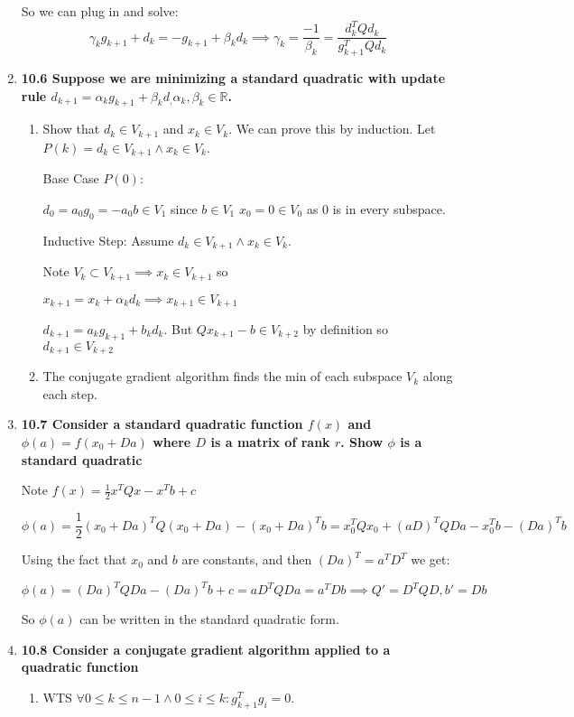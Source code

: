 \documentclass[10pt,a4paper]{article}
\begin{document}
\begin{enumerate}
    So we can plug in and solve: $$\gamma_k g_{k+1}+d_k =  -g_{k+1} + \beta_k d_k \implies \gamma_k = \frac{-1}{\beta_k} = \frac{d_k^TQd_k}{g_{k+1}^TQd_k}$$


    \item \textbf{10.6 Suppose we are minimizing a standard quadratic with update rule $d_{k+1} = \alpha_k g_{k+1} +\beta_k d_, \alpha_k, \beta_k \in \mathbb{R}$. }
    \begin{enumerate}
        \item Show that $d_k \in V_{k+1}$ and $x_k \in V_k$. 
        We can prove this by induction. Let $P(k) = d_k \in V_{k+1} \land x_k \in V_k$.

        Base Case $P(0)$:

        $d_0 = a_0g_0 = -a_0b \in V_1$ since $b \in V_1$ 
        $x_0 = 0 \in V_0$ as $0$ is in every subspace.

        Inductive Step: Assume $d_k \in V_{k+1} \land x_k \in V_{k}$.

        Note $V_k \subset V_{k+1} \implies x_k \in V_{k+1}$ so 

        $x_{k+1} = x_k + \alpha_k d_k \implies x_{k+1} \in V_{k+1}$

        $d_{k+1} = a_k g_{k+1} + b_k d_k$. But $Qx_{k+1} -b \in V_{k+2}$ by definition so $d_{k+1} \in V_{k+2}$

        \item The conjugate gradient algorithm finds the min of each subspace $V_k$ along each step.

    \end{enumerate}

    \item \textbf{10.7 Consider a standard quadratic function $f(x)$ and $\phi(a) = f(x_0+Da)$ where $D$ is a matrix of rank $r$. Show $\phi$ is a standard quadratic }
    
    Note $f(x) = \frac{1}{2}x^TQx - x^Tb +c$

    $$\phi(a) = \frac{1}{2}(x_0+Da)^TQ(x_0+Da) - (x_0+Da)^Tb = x_0^TQx_0 + (aD)^TQDa - x_0^Tb - (Da)^Tb$$

    Using the fact that $x_0$ and $b$ are constants, and then $(Da)^T = a^TD^T$ we get:

    $$\phi(a) = (Da)^TQDa - (Da)^Tb +c = aD^TQDa = a^TDb \implies Q' = D^TQD, b' = Db$$

    So $\phi(a)$ can be written in the standard quadratic form.

    \item \textbf{10.8 Consider a conjugate gradient algorithm applied to a quadratic function}
    \begin{enumerate}    
        \item WTS $\forall 0 \leq k \leq n-1 \land 0 \leq i \leq k: g_{k+1}^Tg_i = 0 $.
        

\end{enumerate}
\end{enumerate}
\end{document}
